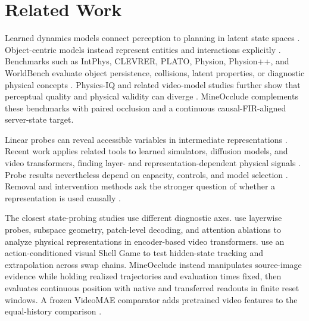 \documentclass{article}
\begin{document}
\section{Related Work}

Learned dynamics models connect perception to planning in latent state spaces \citep{hafner2019planet,hafner2020dreamer,hafner2023mastering,schrittwieser2020muzero}. Object-centric models instead represent entities and interactions explicitly \citep{battaglia2016interaction,watters2017visual,kipf2020contrastive}. 
Benchmarks such as IntPhys, CLEVRER, PLATO, Physion, Physion++, and WorldBench evaluate object persistence, collisions, latent properties, or diagnostic physical concepts \citep{riochet2018intphys,yi2020clevrer,piloto2022intuitive,weihs2022benchmarking,tung2023physionpp,upadhyay2026worldbench, bear2021physion}. Physics-IQ and related video-model studies further show that perceptual quality and physical validity can diverge \citep{motamed2025generative,garrido2025intuitive,gu2025geco}. MineOcclude complements these benchmarks with paired occlusion and a continuous causal-FIR-aligned server-state target.

Linear probes can reveal accessible variables in intermediate representations \citep{alain2017understanding,li2023emergent,nanda2023emergent,shai2024transformers}. Recent work applies related tools to learned simulators, diffusion models, and video transformers, finding layer- and representation-dependent physical signals \citep{zhang2026whatdo,chen2023beyond,esmati2026invisible,joseph2026interpreting}. Probe results nevertheless depend on capacity, controls, and model selection \citep{hewitt2019designing,belinkov2022probing}. Removal and intervention methods ask the stronger question of whether a representation is used causally \citep{elazar2021amnesic,kim2018interpretability,geiger2024finding}.

The closest state-probing studies use different diagnostic axes. \citet{joseph2026interpreting} use layerwise probes, subspace geometry, patch-level decoding, and attention ablations to analyze physical representations in encoder-based video transformers. \citet{shin2026unobserved} use an action-conditioned visual Shell Game to test hidden-state tracking and extrapolation across swap chains. MineOcclude instead manipulates source-image evidence while holding realized trajectories and evaluation times fixed, then evaluates continuous position with native and transferred readouts in finite reset windows. A frozen VideoMAE comparator adds pretrained video features to the equal-history comparison \citep{tong2022videomae}.
\end{document}
